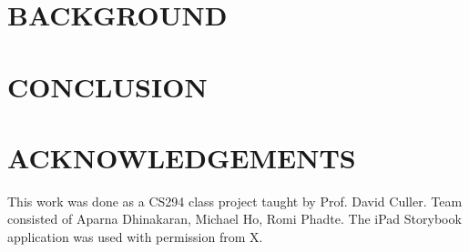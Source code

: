 \documentclass{sigchi}
\begin{document}
\section{BACKGROUND}
\lipsum[3]



\section{CONCLUSION}
  \lipsum[1]


\section{ACKNOWLEDGEMENTS}
This work was done as a CS294 class project taught by Prof. David Culler. 
Team consisted of Aparna Dhinakaran, Michael Ho, Romi Phadte. 
The iPad Storybook application was used with permission from X. 

\balance


\end{document}
